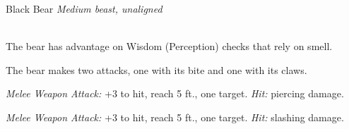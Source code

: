 \documentclass[10pt,twoside,twocolumn,openany]{book}
\begin{document}
\begin{monsterboxnobg}{Black Bear}
	\textit{Medium beast, unaligned}\\
	\hline
	\basics[
		armorclass	= 11 (natural armor),
		hitpoints 		= \dice{3d8 + 6},
		speed		= {40 ft., climb 30 ft.}
	]
	\hline
	\stats[
		STR	= \stat{15}, 
		DEX	= \stat{10},
		CON	= \stat{14},
		INT	= \stat{2},
		WIS	= \stat{12},
		CHA	= \stat{7}
	]
	\hline
	\details[
	skills			= {Perception +3},
	senses		= {passive Perception 11},
	languages		= {-},
	challenge		= 1/2
	]
	\hline \\[1mm]
	\begin{monsteraction}
		The bear has advantage on Wisdom (Perception) checks that rely on smell.
	\end{monsteraction}
	\begin{monsteraction}[Multiattack]
		The bear makes two attacks, one with its bite and one with its claws.
	\end{monsteraction}
	
	\begin{monsteraction}[Bite]
		\textit{Melee Weapon Attack:} +3 to hit, reach 5 ft., one target. \textit{Hit:}  piercing damage.
	\end{monsteraction}
	
	\begin{monsteraction}[Claws]
		\textit{Melee Weapon Attack:} +3 to hit, reach 5 ft., one target. \textit{Hit:}  slashing damage.
	\end{monsteraction}	
\end{monsterboxnobg}
\end{document}
